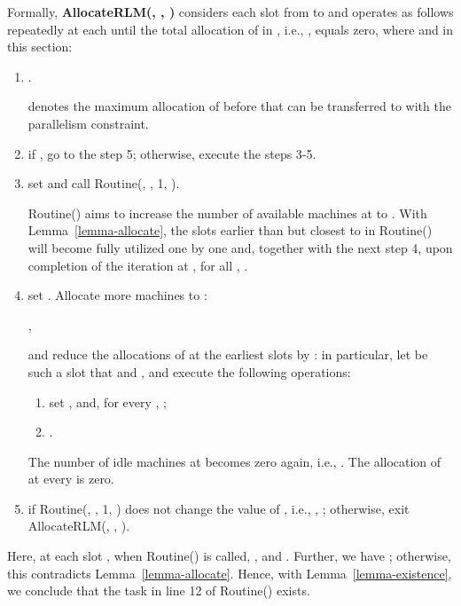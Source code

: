 \documentclass[10pt,journal,compsoc]{IEEEtran}
\begin{document}
Formally, \textbf{AllocateRLM(, , )} considers each slot  from  to  and operates as follows repeatedly at each  until the total allocation of  in , i.e., , equals zero, where  and  in this section:
\begin{enumerate}
 \setlength\itemsep{0.1em}

  \item  .

        \setlength{\parindent}{1em}\vspace{0.01em}{\em Notes.}  denotes the maximum allocation of  before  that can be transferred to  with the parallelism constraint.

  \item if , go to the step 5; otherwise, execute the steps 3-5.

  \item set  and call Routine(, , 1, ).

      \setlength{\parindent}{1em}\vspace{0.01em}{\em Notes.} Routine() aims to increase the number  of available machines at  to . With Lemma~\ref{lemma-allocate}, the slots  earlier than but closest to  in Routine() will become fully utilized one by one and, together with the next step 4, upon completion of the iteration at , for all , .


  \item set . Allocate  more machines to :
  \begin{center}
  ,
  \end{center}
   and reduce the allocations of  at the earliest slots by : in particular, let  be such a slot that  and , and execute the following operations:
      \begin{enumerate}
 \setlength\itemsep{0.15em}
        \item set , and, for every , ;
        \item .
      \end{enumerate}

       The number of idle machines at  becomes zero again, i.e., . The allocation  of  at every  is zero.

  \item if Routine(, , 1, ) does not change the value of , i.e., , ; otherwise, exit AllocateRLM(, , ).

\end{enumerate}
Here, at each slot , when Routine() is called, , and . Further, we have ; otherwise, this contradicts Lemma~\ref{lemma-allocate}. Hence, with Lemma~\ref{lemma-existence}, we conclude that the task  in line 12 of Routine() exists.
\end{document}
